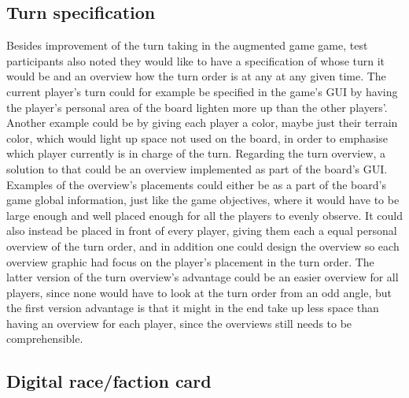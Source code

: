 \subsection{Turn specification}
Besides improvement of the turn taking in the augmented game game, test participants also noted they would like to have a specification of whose turn it would be and an overview how the turn order is at any at any given time. The current player's turn could for example be specified in the game's GUI by having the player's personal area of the board lighten more up than the other players'. Another example could be by giving each player a color, maybe just their terrain color, which would light up space not used on the board, in order to emphasise which player currently is in charge of the turn.
Regarding the turn overview, a solution to that could be an overview implemented as part of the board's GUI. Examples of the overview's placements could either be as a part of the board's game global information, just like the game objectives, where it would have to be large enough and well placed enough for all the players to evenly observe. It could also instead be placed in front of every player, giving them each a equal personal overview of the turn order, and in addition one could design the overview so each overview graphic had focus on the player's placement in the turn order. The latter version of the turn overview's advantage could be an easier overview for all players, since none would have to look at the turn order from an odd angle, but the first version advantage is that it might in the end take up less space than having an overview for each player, since the overviews still needs to be comprehensible.

\subsection{Digital race/faction card}




